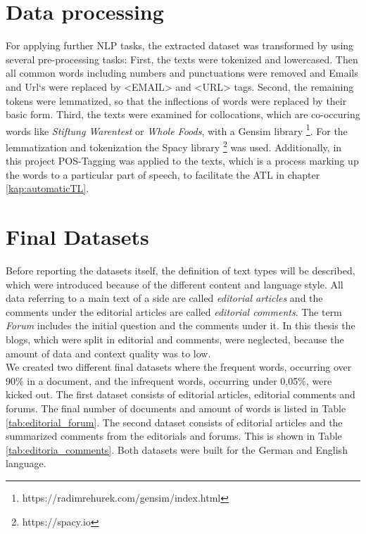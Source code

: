 \section{Data processing}
\label{data:preprocessing}
For applying further \ac{NLP} tasks, the extracted dataset was transformed by using several pre-processing tasks: First, the texts were tokenized and lowercased. Then all common words including numbers and punctuations were removed and Emails and Url`s were replaced by <EMAIL> and <URL> tags. Second, the remaining tokens were lemmatized, so that the inflections of words were replaced by their basic form. Third, the texts were examined for collocations, which are co-occuring words like \textit{Stiftung Warentest} or \textit{Whole Foods},  with a Gensim library \footnote{https://radimrehurek.com/gensim/index.html}. For the lemmatization and tokenization the Spacy library \footnote{https://spacy.io} was used.
Additionally, in this project \ac{POS}-Tagging was applied to the texts, which is a process marking up the words to a particular part of speech, to facilitate the \ac{ATL} in chapter \ref{kap:automaticTL}. 

\section{Final Datasets}
Before reporting the datasets itself, the definition of text types will be described, which were introduced because of the different content and language style. 
All data referring to a main text of a side are called \textit{editorial articles} and the comments under the editorial articles are called \textit{editorial comments}. The term \textit{Forum} includes the initial question and the comments under it.
In this thesis the blogs, which were split in editorial and comments, were neglected, because the amount of data and context quality was to low.\\

We created two different final datasets where the frequent words, occurring over 90\% in a document, and the infrequent words, occurring under 0,05\%, were kicked out.
The first dataset \label{chris:daten} consists of editorial articles, editorial comments and forums. The final number of documents and amount of words is listed in Table \ref{tab:editorial_forum}. The second dataset consists of editorial articles and the summarized comments from the editorials and forums. This is shown in Table \ref{tab:editoria_comments}. Both datasets were built for the German and English language. 

